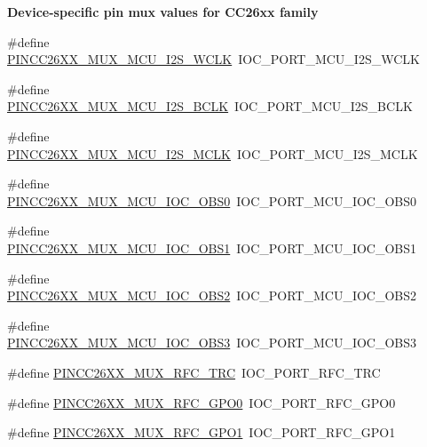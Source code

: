 \begin{Indent}{\bf Device-\/specific pin mux values for C\+C26xx family}
\begin{DoxyCompactItemize}
\item 
\#define \hyperlink{_p_i_n_c_c26_x_x_8h_ab79ff812095158eced35716d506be08e}{P\+I\+N\+C\+C26\+X\+X\+\_\+\+M\+U\+X\+\_\+\+M\+C\+U\+\_\+\+I2\+S\+\_\+\+W\+C\+L\+K}~I\+O\+C\+\_\+\+P\+O\+R\+T\+\_\+\+M\+C\+U\+\_\+\+I2\+S\+\_\+\+W\+C\+L\+K
\item 
\#define \hyperlink{_p_i_n_c_c26_x_x_8h_a1ca04c323c59730e77a057e750844564}{P\+I\+N\+C\+C26\+X\+X\+\_\+\+M\+U\+X\+\_\+\+M\+C\+U\+\_\+\+I2\+S\+\_\+\+B\+C\+L\+K}~I\+O\+C\+\_\+\+P\+O\+R\+T\+\_\+\+M\+C\+U\+\_\+\+I2\+S\+\_\+\+B\+C\+L\+K
\item 
\#define \hyperlink{_p_i_n_c_c26_x_x_8h_ae41e6f48afb4b7b06fac72ef98dd1866}{P\+I\+N\+C\+C26\+X\+X\+\_\+\+M\+U\+X\+\_\+\+M\+C\+U\+\_\+\+I2\+S\+\_\+\+M\+C\+L\+K}~I\+O\+C\+\_\+\+P\+O\+R\+T\+\_\+\+M\+C\+U\+\_\+\+I2\+S\+\_\+\+M\+C\+L\+K
\item 
\#define \hyperlink{_p_i_n_c_c26_x_x_8h_addccd8c5026c8495a80976147d4bc5a7}{P\+I\+N\+C\+C26\+X\+X\+\_\+\+M\+U\+X\+\_\+\+M\+C\+U\+\_\+\+I\+O\+C\+\_\+\+O\+B\+S0}~I\+O\+C\+\_\+\+P\+O\+R\+T\+\_\+\+M\+C\+U\+\_\+\+I\+O\+C\+\_\+\+O\+B\+S0
\item 
\#define \hyperlink{_p_i_n_c_c26_x_x_8h_a57f8194fc7a00cd647911430143188b4}{P\+I\+N\+C\+C26\+X\+X\+\_\+\+M\+U\+X\+\_\+\+M\+C\+U\+\_\+\+I\+O\+C\+\_\+\+O\+B\+S1}~I\+O\+C\+\_\+\+P\+O\+R\+T\+\_\+\+M\+C\+U\+\_\+\+I\+O\+C\+\_\+\+O\+B\+S1
\item 
\#define \hyperlink{_p_i_n_c_c26_x_x_8h_a24858e6ec06e34d6528950cb93fbf9d9}{P\+I\+N\+C\+C26\+X\+X\+\_\+\+M\+U\+X\+\_\+\+M\+C\+U\+\_\+\+I\+O\+C\+\_\+\+O\+B\+S2}~I\+O\+C\+\_\+\+P\+O\+R\+T\+\_\+\+M\+C\+U\+\_\+\+I\+O\+C\+\_\+\+O\+B\+S2
\item 
\#define \hyperlink{_p_i_n_c_c26_x_x_8h_a8e5035975aa783c89f1f1dca963300b8}{P\+I\+N\+C\+C26\+X\+X\+\_\+\+M\+U\+X\+\_\+\+M\+C\+U\+\_\+\+I\+O\+C\+\_\+\+O\+B\+S3}~I\+O\+C\+\_\+\+P\+O\+R\+T\+\_\+\+M\+C\+U\+\_\+\+I\+O\+C\+\_\+\+O\+B\+S3
\item 
\#define \hyperlink{_p_i_n_c_c26_x_x_8h_a4b9269f9eac469a814f20ac6f96196a9}{P\+I\+N\+C\+C26\+X\+X\+\_\+\+M\+U\+X\+\_\+\+R\+F\+C\+\_\+\+T\+R\+C}~I\+O\+C\+\_\+\+P\+O\+R\+T\+\_\+\+R\+F\+C\+\_\+\+T\+R\+C
\item 
\#define \hyperlink{_p_i_n_c_c26_x_x_8h_a89e0489423caa21a1e6339e018d925f2}{P\+I\+N\+C\+C26\+X\+X\+\_\+\+M\+U\+X\+\_\+\+R\+F\+C\+\_\+\+G\+P\+O0}~I\+O\+C\+\_\+\+P\+O\+R\+T\+\_\+\+R\+F\+C\+\_\+\+G\+P\+O0
\item 
\#define \hyperlink{_p_i_n_c_c26_x_x_8h_aab76af2130f96f3da07131cfd232ce71}{P\+I\+N\+C\+C26\+X\+X\+\_\+\+M\+U\+X\+\_\+\+R\+F\+C\+\_\+\+G\+P\+O1}~I\+O\+C\+\_\+\+P\+O\+R\+T\+\_\+\+R\+F\+C\+\_\+\+G\+P\+O1

\end{DoxyCompactItemize}
\end{Indent}
